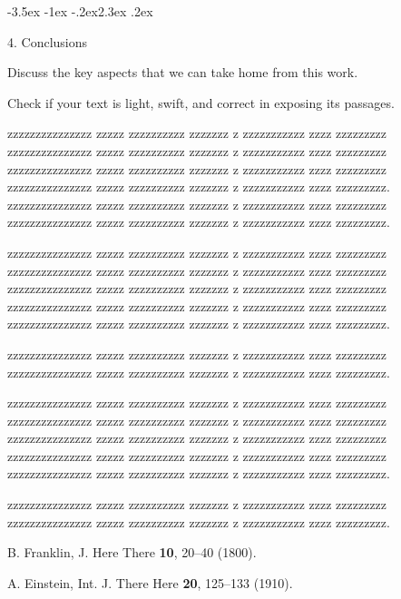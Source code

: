 \documentclass[prl,twocolumn]{revtex4-1}
\makeatletter
\renewcommand{\section}{\@startsection{section}{1}{\z@}%
	{-3.5ex \@plus -1ex \@minus -.2ex}{2.3ex \@plus.2ex}%
	{\normalfont\bfseries\raggedright}}
\makeatother
\begin{document}
\section{4. Conclusions}

Discuss the key aspects that we can take home from this work.

Check if your text is light, swift, and correct in exposing its passages.

  zzzzzzzzzzzzzzz zzzzz zzzzzzzzzz zzzzzzz z zzzzzzzzzzz zzzz zzzzzzzzz
  zzzzzzzzzzzzzzz zzzzz zzzzzzzzzz zzzzzzz z zzzzzzzzzzz zzzz zzzzzzzzz
  zzzzzzzzzzzzzzz zzzzz zzzzzzzzzz zzzzzzz z zzzzzzzzzzz zzzz zzzzzzzzz
  zzzzzzzzzzzzzzz zzzzz zzzzzzzzzz zzzzzzz z zzzzzzzzzzz zzzz zzzzzzzzz.
  zzzzzzzzzzzzzzz zzzzz zzzzzzzzzz zzzzzzz z zzzzzzzzzzz zzzz zzzzzzzzz
  zzzzzzzzzzzzzzz zzzzz zzzzzzzzzz zzzzzzz z zzzzzzzzzzz zzzz zzzzzzzzz.

  
  zzzzzzzzzzzzzzz zzzzz zzzzzzzzzz zzzzzzz z zzzzzzzzzzz zzzz zzzzzzzzz
  zzzzzzzzzzzzzzz zzzzz zzzzzzzzzz zzzzzzz z zzzzzzzzzzz zzzz zzzzzzzzz
  zzzzzzzzzzzzzzz zzzzz zzzzzzzzzz zzzzzzz z zzzzzzzzzzz zzzz zzzzzzzzz
  zzzzzzzzzzzzzzz zzzzz zzzzzzzzzz zzzzzzz z zzzzzzzzzzz zzzz zzzzzzzzz
  zzzzzzzzzzzzzzz zzzzz zzzzzzzzzz zzzzzzz z zzzzzzzzzzz zzzz zzzzzzzzz.
  
  zzzzzzzzzzzzzzz zzzzz zzzzzzzzzz zzzzzzz z zzzzzzzzzzz zzzz zzzzzzzzz
  zzzzzzzzzzzzzzz zzzzz zzzzzzzzzz zzzzzzz z zzzzzzzzzzz zzzz zzzzzzzzz.

  
  
  zzzzzzzzzzzzzzz zzzzz zzzzzzzzzz zzzzzzz z zzzzzzzzzzz zzzz zzzzzzzzz
  zzzzzzzzzzzzzzz zzzzz zzzzzzzzzz zzzzzzz z zzzzzzzzzzz zzzz zzzzzzzzz
  zzzzzzzzzzzzzzz zzzzz zzzzzzzzzz zzzzzzz z zzzzzzzzzzz zzzz zzzzzzzzz
  zzzzzzzzzzzzzzz zzzzz zzzzzzzzzz zzzzzzz z zzzzzzzzzzz zzzz zzzzzzzzz
  zzzzzzzzzzzzzzz zzzzz zzzzzzzzzz zzzzzzz z zzzzzzzzzzz zzzz zzzzzzzzz.
  
  zzzzzzzzzzzzzzz zzzzz zzzzzzzzzz zzzzzzz z zzzzzzzzzzz zzzz zzzzzzzzz
  zzzzzzzzzzzzzzz zzzzz zzzzzzzzzz zzzzzzz z zzzzzzzzzzz zzzz zzzzzzzzz.

  





\begin{thebibliography}{99}

  B. Franklin,
  J. Here There {\bf 10}, 20--40 (1800).
  
  A. Einstein,
  Int. J. There Here {\bf 20}, 125--133 (1910).
  
\end{thebibliography}
\end{document}
